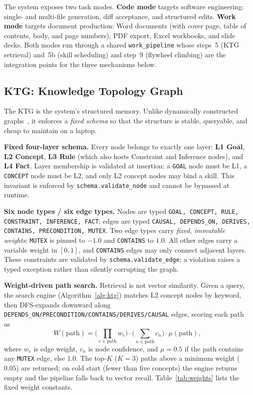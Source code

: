 \documentclass[sigconf]{acmart}
\begin{document}
The system exposes two task modes. \textbf{Code mode} targets software engineering: single- and multi-file generation, diff acceptance, and structured edits. \textbf{Work mode} targets document production: Word documents (with cover page, table of contents, body, and page numbers), PDF export, Excel workbooks, and slide decks. Both modes run through a shared \texttt{work\_pipeline} whose steps~5 (KTG retrieval) and~5b (skill scheduling) and step~9 (flywheel climbing) are the integration points for the three mechanisms below.

\subsection{KTG: Knowledge Topology Graph}\label{sec:ktg}

The KTG is the system's structured memory. Unlike dynamically constructed graphs~\cite{edge2024graphrag}, it enforces a \emph{fixed schema} so that the structure is stable, queryable, and cheap to maintain on a laptop.

\textbf{Fixed four-layer schema.} Every node belongs to exactly one layer: \textbf{L1 Goal}, \textbf{L2 Concept}, \textbf{L3 Rule} (which also hosts Constraint and Inference nodes), and \textbf{L4 Fact}. Layer membership is validated at insertion: a \texttt{GOAL} node must be L1, a \texttt{CONCEPT} node must be L2, and only L2 concept nodes may bind a skill. This invariant is enforced by \texttt{schema.validate\_node} and cannot be bypassed at runtime.

\textbf{Six node types / six edge types.} Nodes are typed \texttt{GOAL, CONCEPT, RULE, CONSTRAINT, INFERENCE, FACT}; edges are typed \texttt{CAUSAL, DEPENDS\_ON, DERIVES, CONTAINS, PRECONDITION, MUTEX}. Two edge types carry \emph{fixed, immutable weights}: \texttt{MUTEX} is pinned to $-1.0$ and \texttt{CONTAINS} to $1.0$. All other edges carry a variable weight in $[0,1]$, and \texttt{CONTAINS} edges may only connect adjacent layers. These constraints are validated by \texttt{schema.validate\_edge}; a violation raises a typed exception rather than silently corrupting the graph.

\textbf{Weight-driven path search.} Retrieval is not vector similarity. Given a query, the search engine (Algorithm~\ref{alg:ktg}) matches L2 concept nodes by keyword, then DFS-expands downward along \texttt{DEPENDS\_ON/PRECONDITION/CONTAINS/DERIVES/CAUSAL} edges, scoring each path as
\begin{equation}
  W(\text{path}) = \Big(\prod_{e \in \text{path}} w_e\Big) \cdot \Big(\sum_{n \in \text{path}} c_n\Big) \cdot \mu(\text{path}),
  \label{eq:pathweight}
\end{equation}
where $w_e$ is edge weight, $c_n$ is node confidence, and $\mu=0.5$ if the path contains any \texttt{MUTEX} edge, else $1.0$. The top-$K$ ($K{=}3$) paths above a minimum weight ($0.05$) are returned; on cold start (fewer than five concepts) the engine returns empty and the pipeline falls back to vector recall. Table~\ref{tab:weights} lists the fixed weight constants.
\end{document}

